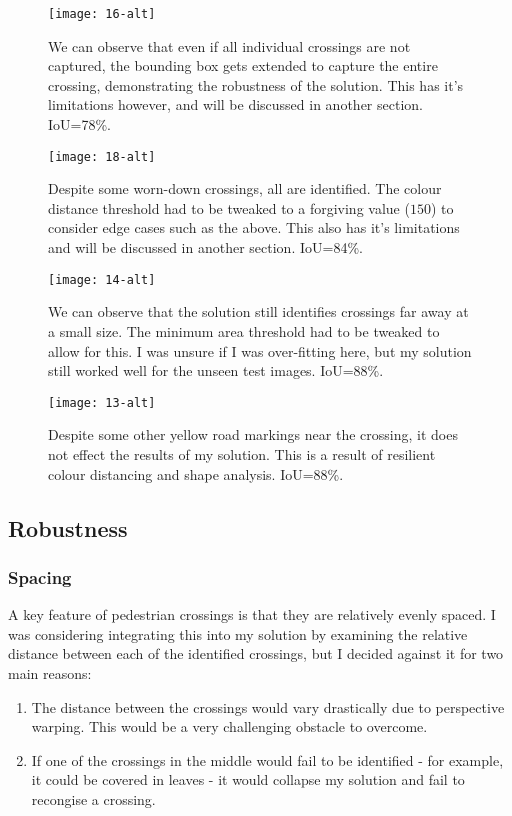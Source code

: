 \documentclass{article}  %
\begin{document}
	\begin{figure}[H]
		\begin{minipage}[c]{0.45\linewidth}
			\centering
			\texttt{[image: 16-alt]}
			\caption{We can observe that even if all individual crossings are not captured, the bounding box gets extended to capture the entire crossing, demonstrating the robustness of the solution. This has it's limitations however, and will be discussed in another section. IoU=78\%.}
		\end{minipage}\hfill
		\begin{minipage}[c]{0.45\linewidth}
			\centering
			\texttt{[image: 18-alt]}
			\caption{Despite some worn-down crossings, all are identified. The colour distance threshold had to be tweaked to a forgiving value ($150$) to consider edge cases such as the above. This also has it's limitations and will be discussed in another section. IoU=84\%.}
		\end{minipage}
	\end{figure}
	
	\begin{figure}[H]
		\begin{minipage}[c]{0.45\linewidth}
			\centering
			\texttt{[image: 14-alt]}
			\caption{We can observe that the solution still identifies crossings far away at a small size. The minimum area threshold had to be tweaked to allow for this. I was unsure if I was over-fitting here, but my solution still worked well for the unseen test images. IoU=88\%.}
		\end{minipage}\hfill
		\begin{minipage}[c]{0.45\linewidth}
			\centering
			\texttt{[image: 13-alt]}
			\caption{Despite some other yellow road markings near the crossing, it does not effect the results of my solution. This is a result of resilient colour distancing and shape analysis. IoU=88\%.}
		\end{minipage}
	\end{figure}
	
	\newpage
	\subsection{Robustness}
	
	\subsubsection{Spacing}
	
	A key feature of pedestrian crossings is that they are relatively evenly spaced. I was considering integrating this into my solution by examining the relative distance between each of the identified crossings, but I decided against it for two main reasons: 
	\begin{enumerate}
		\item The distance between the crossings would vary drastically due to perspective warping. This would be a very challenging obstacle to overcome.
		\item If one of the crossings in the middle would fail to be identified - for example, it could be covered in leaves - it would collapse my solution and fail to recongise a crossing.
	\end{enumerate}
	
\end{document}
